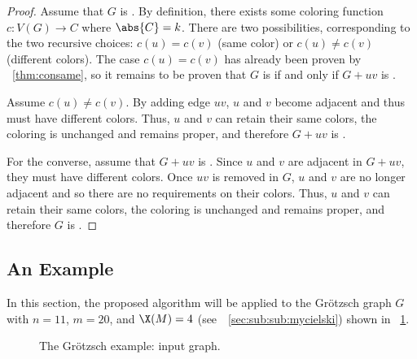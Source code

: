 \begin{proof}
  Assume that \(G\) is .  By definition, there exists some coloring function \(c:V(G)\to C\) where
  \(\abs{C}=k\).  There are two possibilities, corresponding to the two recursive choices: \(c(u)=c(v)\) (same
  color) or \(c(u)\ne c(v)\) (different colors).  The case \(c(u)=c(v)\) has already been proven by
  \theoremname~\ref{thm:consame}, so it remains to be proven that \(G\) is  if and only if \(G+uv\) is
  .

  Assume \(c(u)\ne c(v)\).  By adding edge \(uv\), \(u\) and \(v\) become adjacent and thus must have different
  colors.  Thus, \(u\) and \(v\) can retain their same colors, the coloring is unchanged and remains proper, and
  therefore \(G+uv\) is .
    
  For the converse, assume that \(G+uv\) is .  Since \(u\) and \(v\) are adjacent in
  \(G+uv\), they must have different colors.  Once \(uv\) is removed in \(G\), \(u\) and \(v\) are no longer
  adjacent and so there are no requirements on their colors.  Thus, \(u\) and \(v\) can retain their same colors, the
  coloring is unchanged and remains proper, and therefore \(G\) is .
\end{proof}

\subsection{An Example}\label{sec:sub:example}

In this section, the proposed algorithm will be applied to the Gr\"otzsch graph \(G\) with \(n=11\), \(m=20\), and
\(\X(M)=4\) (see~\sectionname~\ref{sec:sub:sub:mycielski}) shown in \figurename~\ref{fig:example}.

\begin{figure}[H]
  \centering
  \caption{The Gr\"otzsch example: input graph.}
  \label{fig:example}
\end{figure}

